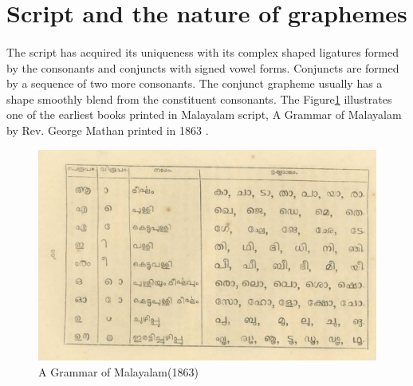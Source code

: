 \documentclass[10pt]{article}
\begin{document}
\section{Script and the nature of graphemes}

\paragraph{}
The script has acquired its uniqueness with its complex shaped ligatures formed by the consonants and conjuncts with signed vowel forms. Conjuncts are formed by a sequence of two more consonants. The conjunct grapheme usually has a shape smoothly blend from the constituent consonants. The Figure\ref{mathan} illustrates one of the earliest books printed in Malayalam script, A Grammar of Malayalam by Rev. George Mathan printed in 1863 \cite{}.

\begin{figure}[h]
	\centering
	\includegraphics[width=1.0\textwidth]{images/mathanSymbols.png}
	\caption{A Grammar of Malayalam(1863)}
	\label{mathan}
\end{figure} 
\end{document}

